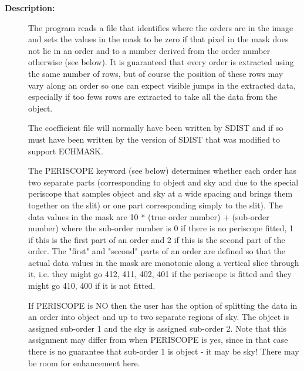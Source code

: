 \begin{description}
\begin{description}
\item [\textbf{Description:}]
 The program reads a file that identifies where the orders are in
 the image and sets the values in the mask to be zero if that pixel
 in the mask does not lie in an order and to a number derived from
 the order number otherwise (see below). It is guaranteed that
 every order is extracted using the same number of rows, but of
 course the position of these rows may vary along an order so one
 can expect visible jumps in the extracted data, especially if too
 fews rows are extracted to take all the data from the object.

 The coefficient file will normally have been written by SDIST and
 if so must have been written by the version of SDIST that was
 modified to support ECHMASK.

 The PERISCOPE keyword (see below) determines whether each order
 has two separate parts (corresponding to object and sky and due to
 the special periscope that samples object and sky at a wide
 spacing and brings them together on the slit) or one part
 corresponding simply to the slit).  The data values in the mask
 are 10 * (true order number) + (sub-order number) where the
 sub-order number is 0 if there is no periscope fitted, 1 if this
 is the first part of an order and 2 if this is the second part of
 the order. The "first" and "second" parts of an order are defined
 so that the actual data values in the mask are monotonic along a
 vertical slice through it, i.e. they might go 412, 411, 402, 401 if
 the periscope is fitted and they might go 410, 400 if it is not
 fitted.

 If PERISCOPE is NO then the user has the option of splitting
 the data in an order into object and up to two separate regions of
 sky. The object is assigned sub-order 1 and the sky is assigned
 sub-order 2. Note that this assignment may differ from when
 PERISCOPE is yes, since in that case there is no guarantee that
 sub-order 1 is object - it may be sky!  There may be room for
 enhancement here.



\end{description}
\end{description}
